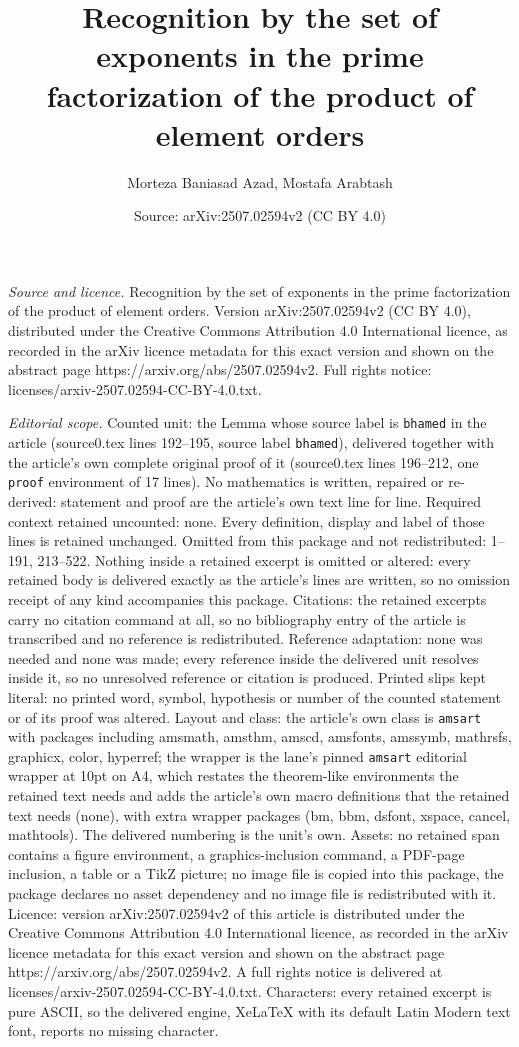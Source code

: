 \documentclass[10pt,a4paper]{amsart}
\title[Recognition by the set of exponents in the prime factorizati]{Recognition by the set of exponents in the prime factorization of the product of element orders}
\author{Morteza Baniasad Azad, Mostafa Arabtash}
\date{Source: arXiv:2507.02594v2 (CC BY 4.0)}
\begin{document}
\maketitle

\noindent\emph{Source and licence.} Recognition by the set of exponents in the prime factorization of the product of element orders. Version arXiv:2507.02594v2 (CC BY 4.0), distributed under the Creative Commons Attribution 4.0 International licence, as recorded in the arXiv licence metadata for this exact version and shown on the abstract page https://arxiv.org/abs/2507.02594v2. Full rights notice: licenses/arxiv-2507.02594-CC-BY-4.0.txt.\par\smallskip

\noindent\textit{Editorial scope.} Counted unit: the Lemma whose source label is \texttt{bhamed} in the article (source0.tex lines 192--195, source label \texttt{bhamed}), delivered together with the article's own complete original proof of it (source0.tex lines 196--212, one \texttt{proof} environment of 17 lines). No mathematics is written, repaired or re-derived: statement and proof are the article's own text line for line. Required context retained uncounted: none. Every definition, display and label of those lines is retained unchanged. Omitted from this package and not redistributed: 1--191, 213--522. Nothing inside a retained excerpt is omitted or altered: every retained body is delivered exactly as the article's lines are written, so no omission receipt of any kind accompanies this package. Citations: the retained excerpts carry no citation command at all, so no bibliography entry of the article is transcribed and no reference is redistributed. Reference adaptation: none was needed and none was made; every reference inside the delivered unit resolves inside it, so no unresolved reference or citation is produced. Printed slips kept literal: no printed word, symbol, hypothesis or number of the counted statement or of its proof was altered. Layout and class: the article's own class is \texttt{amsart} with packages including amsmath, amsthm, amscd, amsfonts, amssymb, mathrsfs, graphicx, color, hyperref; the wrapper is the lane's pinned \texttt{amsart} editorial wrapper at 10pt on A4, which restates the theorem-like environments the retained text needs and adds the article's own macro definitions that the retained text needs (none), with extra wrapper packages (bm, bbm, dsfont, xspace, cancel, mathtools). The delivered numbering is the unit's own. Assets: no retained span contains a figure environment, a graphics-inclusion command, a PDF-page inclusion, a table or a TikZ picture; no image file is copied into this package, the package declares no asset dependency and no image file is redistributed with it. Licence: version arXiv:2507.02594v2 of this article is distributed under the Creative Commons Attribution 4.0 International licence, as recorded in the arXiv licence metadata for this exact version and shown on the abstract page https://arxiv.org/abs/2507.02594v2. A full rights notice is delivered at licenses/arxiv-2507.02594-CC-BY-4.0.txt. Characters: every retained excerpt is pure ASCII, so the delivered engine, XeLaTeX with its default Latin Modern text font, reports no missing character.
\end{document}

